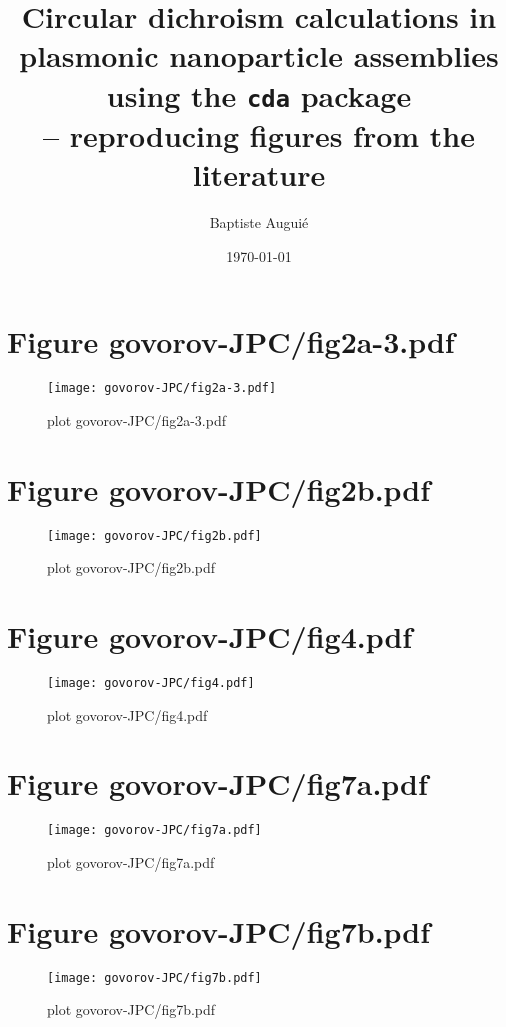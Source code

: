 \documentclass[12pt, a4paper]{article}
\title{Circular dichroism calculations in plasmonic nanoparticle assemblies using the \texttt{cda} package\\
-- reproducing figures from the literature}
\author{Baptiste Augui\'e}
\date{\today}
\begin{document}
\maketitle






\pagebreak

\section{Figure govorov-JPC/fig2a-3.pdf}
\begin{figure}[!Hb]
  \centering
  \texttt{[image: govorov-JPC/fig2a-3.pdf]}
  \caption{plot govorov-JPC/fig2a-3.pdf}
\end{figure}


\pagebreak

\section{Figure govorov-JPC/fig2b.pdf}
\begin{figure}[!Hb]
  \centering
  \texttt{[image: govorov-JPC/fig2b.pdf]}
  \caption{plot govorov-JPC/fig2b.pdf}
\end{figure}


\pagebreak

\section{Figure govorov-JPC/fig4.pdf}
\begin{figure}[!Hb]
  \centering
  \texttt{[image: govorov-JPC/fig4.pdf]}
  \caption{plot govorov-JPC/fig4.pdf}
\end{figure}


\pagebreak

\section{Figure govorov-JPC/fig7a.pdf}
\begin{figure}[!Hb]
  \centering
  \texttt{[image: govorov-JPC/fig7a.pdf]}
  \caption{plot govorov-JPC/fig7a.pdf}
\end{figure}


\pagebreak

\section{Figure govorov-JPC/fig7b.pdf}
\begin{figure}[!Hb]
  \centering
  \texttt{[image: govorov-JPC/fig7b.pdf]}
  \caption{plot govorov-JPC/fig7b.pdf}
\end{figure}
\end{document}
